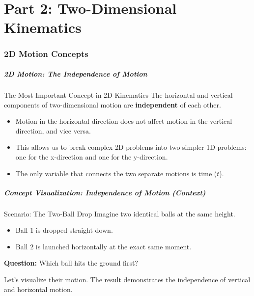 \documentclass{beamer}
\begin{document}
\part{Part 2: Two-Dimensional Kinematics}
\section{2D Motion Concepts}

\begin{frame}
\frametitle{2D Motion: The Independence of Motion}
\begin{block}{The Most Important Concept in 2D Kinematics}
The horizontal and vertical components of two-dimensional motion are \textbf{independent} of each other.
\end{block}
\begin{itemize}
    \item Motion in the horizontal direction does not affect motion in the vertical direction, and vice versa.
    \item This allows us to break complex 2D problems into two simpler 1D problems: one for the x-direction and one for the y-direction.
    \item The only variable that connects the two separate motions is \alert{time ($t$)}.
\end{itemize}
\end{frame}

\begin{frame}
\frametitle{Concept Visualization: Independence of Motion (Context)}
\begin{block}{Scenario: The Two-Ball Drop}
Imagine two identical balls at the same height.
\begin{itemize}
    \item Ball 1 is dropped straight down.
    \item Ball 2 is launched horizontally at the exact same moment.
\end{itemize}
\textbf{Question:} Which ball hits the ground first?
\end{block}
Let's visualize their motion. The result demonstrates the independence of vertical and horizontal motion.
\end{frame}
\end{document}
